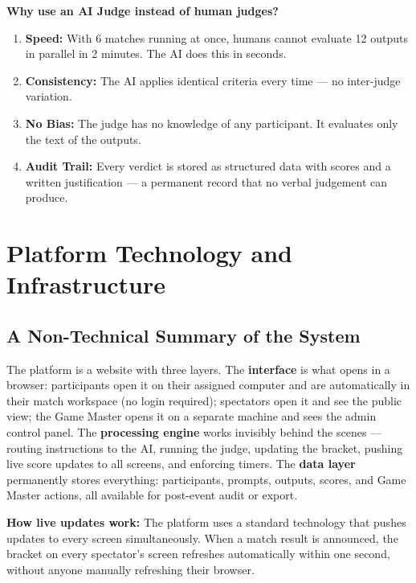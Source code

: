 \documentclass[11pt, a4paper]{article}
\begin{document}
\textbf{Why use an AI Judge instead of human judges?}
\begin{enumerate}[leftmargin=1.2cm, itemsep=2pt]
    \item \textbf{Speed:} With 6 matches running at once, humans cannot evaluate 12 outputs in parallel in 2 minutes. The AI does this in seconds.
    \item \textbf{Consistency:} The AI applies identical criteria every time --- no inter-judge variation.
    \item \textbf{No Bias:} The judge has no knowledge of any participant. It evaluates only the text of the outputs.
    \item \textbf{Audit Trail:} Every verdict is stored as structured data with scores and a written justification --- a permanent record that no verbal judgement can produce.
\end{enumerate}

\section{Platform Technology and Infrastructure}

\subsection{A Non-Technical Summary of the System}

The platform is a website with three layers. The \textbf{interface} is what opens in a browser: participants open it on their assigned computer and are automatically in their match workspace (no login required); spectators open it and see the public view; the Game Master opens it on a separate machine and sees the admin control panel. The \textbf{processing engine} works invisibly behind the scenes --- routing instructions to the AI, running the judge, updating the bracket, pushing live score updates to all screens, and enforcing timers. The \textbf{data layer} permanently stores everything: participants, prompts, outputs, scores, and Game Master actions, all available for post-event audit or export.

\textbf{How live updates work:} The platform uses a standard technology that pushes updates to every screen simultaneously. When a match result is announced, the bracket on every spectator's screen refreshes automatically within one second, without anyone manually refreshing their browser.
\end{document}
